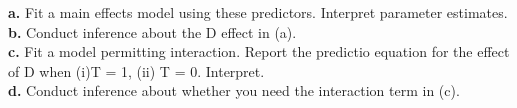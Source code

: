 \documentclass[paper=letter, fontsize=11pt]{scrartcl} %
\begin{document}
\textbf{a.} Fit a main effects model using these predictors. Interpret parameter 
estimates. \\

\textbf{b.} Conduct inference about the D effect in (a). \\

\textbf{c.} Fit a model permitting interaction. Report the predictio equation for the 
effect of D when (i)T = 1, (ii) T = 0. Interpret. \\

\textbf{d.} Conduct inference about whether you need the interaction term in (c).
\end{document}
